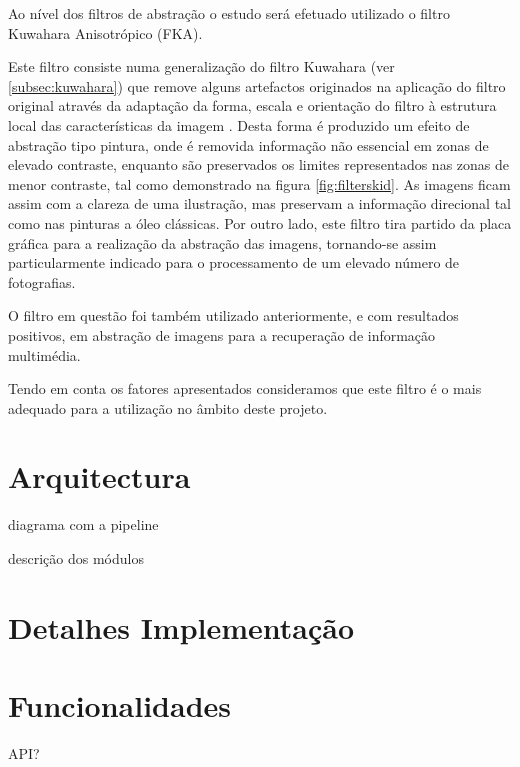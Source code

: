 Ao nível dos filtros de abstração o estudo será efetuado utilizado o filtro Kuwahara Anisotrópico (FKA).

Este filtro consiste numa generalização do filtro Kuwahara (ver \ref{subsec:kuwahara}) que remove alguns artefactos originados na aplicação do filtro original através da adaptação da forma, escala e orientação do filtro à estrutura local das características da imagem \cite{Kyprianidis2009}. Desta forma é produzido um efeito de abstração tipo pintura, onde é removida informação não essencial em zonas de elevado contraste, enquanto são preservados os limites representados nas zonas de menor contraste, tal como demonstrado na figura \ref{fig:filterskid}. As imagens ficam assim com a clareza de uma ilustração, mas preservam a informação direcional tal como nas pinturas a óleo clássicas. Por outro lado, este filtro tira partido da placa gráfica para a realização da abstração das imagens, tornando-se assim particularmente indicado para o processamento de um elevado número de fotografias.

O filtro em questão foi também utilizado anteriormente, e com resultados positivos, em abstração de imagens para a recuperação de informação multimédia. 

Tendo em conta os fatores apresentados consideramos que este filtro é o mais adequado para a utilização no âmbito deste projeto.
	
\section{Arquitectura}

	diagrama com a pipeline
	
	descrição dos módulos
	
\section{Detalhes Implementação}


\section{Funcionalidades}

	API?

